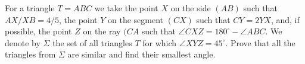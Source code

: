 For a triangle $T = ABC$ we take the point $X$ on the side $(AB)$ such that $AX/XB = 4/5$, the point $Y$ on the segment $(CX)$ such that $CY = 2YX$, and, if possible, the point $Z$ on the ray $(CA$ such that $\angle CXZ = 180^\circ - \angle ABC$. We denote by $\Sigma$ the set of all triangles $T$ for which $\angle XYZ = 45^\circ$. Prove that all the triangles from $\Sigma$ are similar and find their smallest angle.
